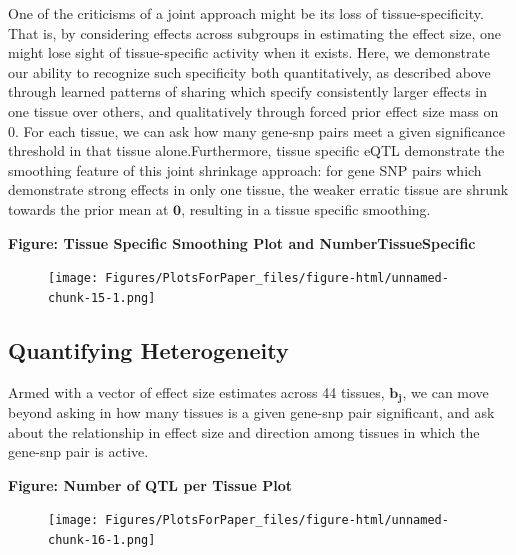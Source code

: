 One of the criticisms of a joint approach might be its loss of tissue-specificity. That is, by considering effects across subgroups in estimating the effect size, one might lose sight of tissue-specific activity when it exists. Here, we demonstrate our ability to recognize such specificity both quantitatively, as described above through learned patterns of sharing which specify consistently larger effects in one tissue over others, and qualitatively through forced prior effect size mass on 0.  For each tissue, we can ask how many gene-snp pairs meet a given significance threshold in that tissue alone.Furthermore, tissue specific eQTL demonstrate the smoothing feature of this joint shrinkage approach: for gene SNP pairs which demonstrate strong effects in only one tissue, the weaker erratic tissue are shrunk towards the prior mean at $\bm{0}$, resulting in a tissue specific smoothing.\newline


\textbf{Figure: Tissue Specific Smoothing Plot and NumberTissueSpecific}
\newline
\begin{figure}[htbp]
\texttt{[image: Figures/PlotsForPaper\_files/figure-html/unnamed-chunk-15-1.png]}\\
\end{figure}\newline




\subsection{Quantifying Heterogeneity}


Armed with a vector of effect size estimates across 44 tissues, $\bm{b_{j}}$, we can move beyond asking in how many tissues is a given gene-snp pair significant, and ask about the relationship in effect size and direction among tissues in which the gene-snp pair is active.

\textbf{Figure: Number of QTL per Tissue Plot}
\newline
\newline
\begin{figure}[htbp]
\texttt{[image: Figures/PlotsForPaper\_files/figure-html/unnamed-chunk-16-1.png]}\\
\end{figure}\newline

